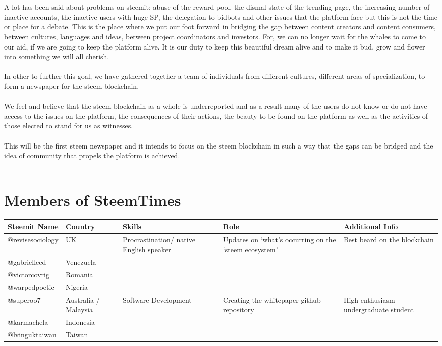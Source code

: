 \documentclass[a4paper,12pt]{article}
\begin{document}
\\\\
A lot has been said about problems on steemit: abuse of the reward pool, the dismal state of the trending page, the increasing number of inactive accounts, the inactive users with huge SP, the delegation to bidbots and other issues that the platform face but this is not the time or place for a debate. This is the place where we put our foot forward in bridging the gap between content creators and content consumers, between cultures, languages and ideas, between project coordinators and investors. For, we can no longer wait for the whales to come to our aid, if we are going to keep the platform alive. It is our duty to keep this beautiful dream alive and to make it bud, grow and flower into something we will all cherish. 
\\\\
In other to further this goal, we have gathered together a team of individuals from different cultures, different areas of specialization, to form a newspaper for the steem blockchain.
\\\\
We feel and believe that the steem blockchain as a whole is underreported and as a result many of the users do not know or do not have access to the issues on the platform, the consequences of their actions, the beauty to be found on the platform as well as the activities of those elected to stand for us as witnesses. 
\\\\
This will be the first steem newspaper and it intends to focus on the steem blockchain in such a way that the gaps can be bridged and the idea of community that propels the platform is achieved.
\\\\

\section{Members of SteemTimes}
\begin{center}
\begin{tabular} {|p{7em}|p{4em}|p{7em}|p{7.5em}|p{7.5em}|}
\hline
Steemit Name & Country & Skills & Role & Additional Info \\
\hline
@revisesociology & UK & Procrastination/ native English speaker & Updates on ‘what’s occurring on the ‘steem ecosystem’ & Best beard on the blockchain \\
\hline
@gabriellecd & Venezuela & & & \\
\hline
@victorcovrig & Romania & & & \\
\hline
@warpedpoetic & Nigeria & & & \\
\hline
@superoo7 & Australia / Malaysia & Software Development & Creating the whitepaper github repository & High enthusiasm undergraduate student \\
\hline
@karmachela & Indonesia & & & \\
\hline
@lvinguktaiwan & Taiwan & & & \\
\hline
\end{tabular}
\end{center}
\end{document}

